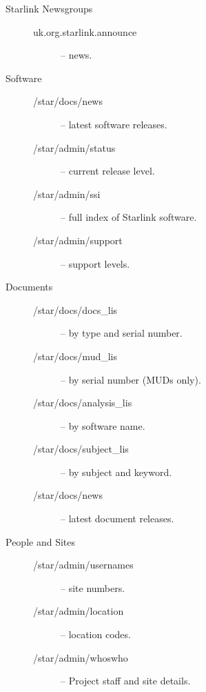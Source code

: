 \documentclass[twoside]{article}
\begin{document}
\begin{description}

\item [Starlink Newsgroups] \hspace*{\fill}

\begin{description}
\item [uk.org.starlink.announce] -- news.
\end{description}

\item [Software] \hspace*{\fill}

\begin{description}
\item [/star/docs/news] -- latest software releases.
\item [/star/admin/status] -- current release level.
\item [/star/admin/ssi] -- full index of Starlink software.
\item [/star/admin/support] -- support levels.
\end{description}

\item [Documents] \hspace*{\fill}

\begin{description}
\item [/star/docs/docs\_lis] --  by type and serial number.
\item [/star/docs/mud\_lis] -- by serial number (MUDs only).
\item [/star/docs/analysis\_lis] -- by software name.
\item [/star/docs/subject\_lis] --  by subject and keyword.
\item [/star/docs/news] -- latest document releases.
\end{description}

\item [People and Sites] \hspace*{\fill}

\begin{description}
\item [/star/admin/usernames] -- site numbers.
\item [/star/admin/location] -- location codes.
\item [/star/admin/whoswho] -- Project staff and site details.
\end{description}

\end{description}
\end{document}
